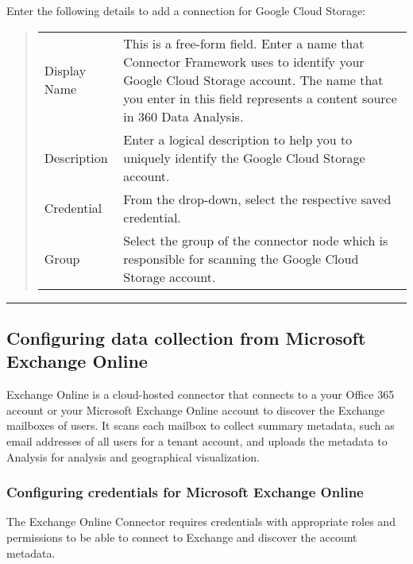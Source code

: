 \documentclass[letterpaper,10pt,english]{sphinxmanual}
\begin{document}
Enter the following details to add a connection for Google Cloud Storage:
\begin{quote}



\begin{savenotes}\sphinxattablestart
\centering
\begin{tabulary}{\linewidth}[t]{|T|T|}
\hline
{}\relax &\relax \\
\hline
Display Name
&
This is a free-form field. Enter a name that Connector Framework uses
to identify your Google Cloud Storage account.
The name that you enter in this field represents a content source in
360 Data Analysis.
\\
\hline
Description
&
Enter a logical description to help you to uniquely identify the Google
Cloud Storage account.
\\
\hline
Credential
&
From the drop-down, select the respective saved credential.
\\
\hline
Group
&
Select the group of the connector node which is responsible for
scanning the Google Cloud Storage account.
\\
\hline
\end{tabulary}
\par
\sphinxattableend\end{savenotes}
\end{quote}


\bigskip\hrule\bigskip



\subsection{Configuring data collection from Microsoft Exchange Online}
\label{\detokenize{mcdmp_app_ug:configuring-data-collection-from-microsoft-exchange-online}}
Exchange Online is a cloud-hosted connector that connects to a your Office 365 account or your Microsoft Exchange Online account to discover the Exchange mailboxes of users. It scans each mailbox to collect summary metadata, such as email addresses of all users for a tenant account, and uploads the metadata to
Analysis for analysis and geographical visualization.


\subsubsection{Configuring credentials for Microsoft Exchange Online}
\label{\detokenize{mcdmp_app_ug:configuring-credentials-for-microsoft-exchange-online}}
The Exchange Online Connector requires credentials with appropriate roles and permissions to be able to connect to Exchange and discover the account metadata.
\end{document}
